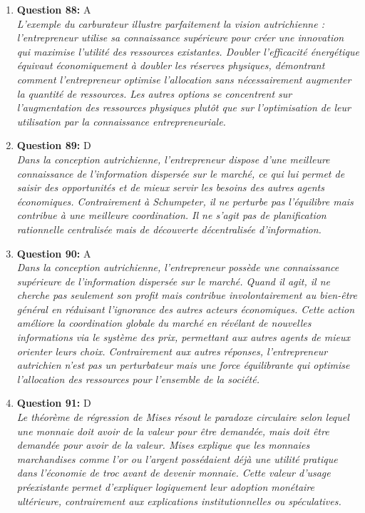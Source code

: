 \documentclass[12pt,a4paper]{article}
\begin{document}
\begin{enumerate}
\item \textbf{Question 88:} A
\\ \textit{L'exemple du carburateur illustre parfaitement la vision autrichienne : l'entrepreneur utilise sa connaissance supérieure pour créer une innovation qui maximise l'utilité des ressources existantes. Doubler l'efficacité énergétique équivaut économiquement à doubler les réserves physiques, démontrant comment l'entrepreneur optimise l'allocation sans nécessairement augmenter la quantité de ressources. Les autres options se concentrent sur l'augmentation des ressources physiques plutôt que sur l'optimisation de leur utilisation par la connaissance entrepreneuriale.}

\item \textbf{Question 89:} D
\\ \textit{Dans la conception autrichienne, l'entrepreneur dispose d'une meilleure connaissance de l'information dispersée sur le marché, ce qui lui permet de saisir des opportunités et de mieux servir les besoins des autres agents économiques. Contrairement à Schumpeter, il ne perturbe pas l'équilibre mais contribue à une meilleure coordination. Il ne s'agit pas de planification rationnelle centralisée mais de découverte décentralisée d'information.}

\item \textbf{Question 90:} A
\\ \textit{Dans la conception autrichienne, l'entrepreneur possède une connaissance supérieure de l'information dispersée sur le marché. Quand il agit, il ne cherche pas seulement son profit mais contribue involontairement au bien-être général en réduisant l'ignorance des autres acteurs économiques. Cette action améliore la coordination globale du marché en révélant de nouvelles informations via le système des prix, permettant aux autres agents de mieux orienter leurs choix. Contrairement aux autres réponses, l'entrepreneur autrichien n'est pas un perturbateur mais une force équilibrante qui optimise l'allocation des ressources pour l'ensemble de la société.}

\item \textbf{Question 91:} D
\\ \textit{Le théorème de régression de Mises résout le paradoxe circulaire selon lequel une monnaie doit avoir de la valeur pour être demandée, mais doit être demandée pour avoir de la valeur. Mises explique que les monnaies marchandises comme l'or ou l'argent possédaient déjà une utilité pratique dans l'économie de troc avant de devenir monnaie. Cette valeur d'usage préexistante permet d'expliquer logiquement leur adoption monétaire ultérieure, contrairement aux explications institutionnelles ou spéculatives.}


\end{enumerate}
\end{document}
